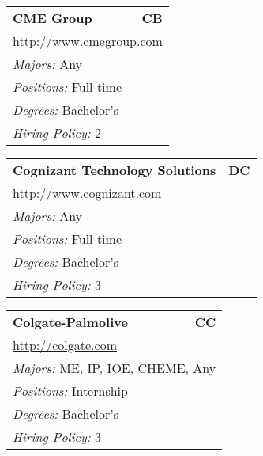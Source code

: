 \documentclass[twoside]{article}
\begin{document}
\begin{center}
\begin{multicols}{3}
\begin{FlushLeft}
\begin{minipage}{.9\columnwidth}
\end{minipage}
 
\begin{minipage}{.9\columnwidth}\begin{tabularx}{.95\columnwidth}{Xr}
                 {\Large\bf CME Group} & {\Large\bf CB}\\
    \multicolumn{2}{p{.95\columnwidth}}{\url{http://www.cmegroup.com}}\\
    \multicolumn{2}{p{.95\columnwidth}}{\emph{Majors:} Any}\\
    \multicolumn{2}{p{.95\columnwidth}}{\emph{Positions:} Full-time}\\
    \multicolumn{2}{p{.95\columnwidth}}{\emph{Degrees:} Bachelor's}\\
    \multicolumn{2}{p{.95\columnwidth}}{\emph{Hiring Policy:} 2}\\
    \end{tabularx}
    
\end{minipage}
 
\begin{minipage}{.9\columnwidth}\begin{tabularx}{.95\columnwidth}{Xr}
                 {\Large\bf Cognizant Technology Solutions} & {\Large\bf DC}\\
    \multicolumn{2}{p{.95\columnwidth}}{\url{http://www.cognizant.com}}\\
    \multicolumn{2}{p{.95\columnwidth}}{\emph{Majors:} Any}\\
    \multicolumn{2}{p{.95\columnwidth}}{\emph{Positions:} Full-time}\\
    \multicolumn{2}{p{.95\columnwidth}}{\emph{Degrees:} Bachelor's}\\
    \multicolumn{2}{p{.95\columnwidth}}{\emph{Hiring Policy:} 3}\\
    \end{tabularx}
    
\end{minipage}
 
\begin{minipage}{.9\columnwidth}\begin{tabularx}{.95\columnwidth}{Xr}
                 {\Large\bf Colgate-Palmolive} & {\Large\bf CC}\\
    \multicolumn{2}{p{.95\columnwidth}}{\url{http://colgate.com}}\\
    \multicolumn{2}{p{.95\columnwidth}}{\emph{Majors:} ME, IP, IOE, CHEME, Any}\\
    \multicolumn{2}{p{.95\columnwidth}}{\emph{Positions:} Internship}\\
    \multicolumn{2}{p{.95\columnwidth}}{\emph{Degrees:} Bachelor's}\\
    \multicolumn{2}{p{.95\columnwidth}}{\emph{Hiring Policy:} 3}\\
    \end{tabularx}
    

\end{minipage}
\end{FlushLeft}
\end{multicols}
\end{center}
\end{document}
